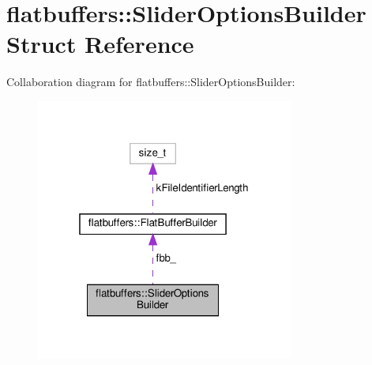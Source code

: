 \hypertarget{structflatbuffers_1_1SliderOptionsBuilder}{}\section{flatbuffers\+:\+:Slider\+Options\+Builder Struct Reference}
\label{structflatbuffers_1_1SliderOptionsBuilder}


Collaboration diagram for flatbuffers\+:\+:Slider\+Options\+Builder\+:
\nopagebreak
\begin{figure}[H]
\begin{center}
\leavevmode
\includegraphics[width=241pt]{structflatbuffers_1_1SliderOptionsBuilder__coll__graph}
\end{center}
\end{figure}
